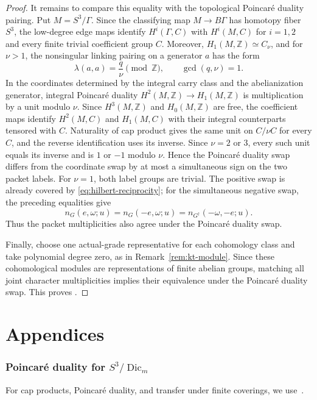 \documentclass[11pt,a4paper,reqno]{amsart}
\theoremstyle{plain}
\theoremstyle{definition}
\theoremstyle{remark}
\numberwithin{equation}{section}
\newcommand{\ZZ}{\mathbb Z}
\newcommand{\Dic}{\operatorname{Dic}}
\begin{document}
\begin{proof}
It remains to compare this equality with the topological Poincar\'e duality pairing. Put $M=S^3/\Gamma$. Since the classifying map $M\to B\Gamma$ has homotopy fiber $S^3$, the low-degree edge maps identify $H^i(\Gamma,C)$ with $H^i(M,C)$ for $i=1,2$ and every finite trivial coefficient group $C$. Moreover, $H_1(M,\ZZ)\simeq C_\nu$, and for $\nu>1$, the nonsingular linking pairing on a generator $a$ has the form
\[
\lambda(a,a)=\frac{q}{\nu}\pmod{\ZZ},\qquad \gcd(q,\nu)=1.
\]
In the coordinates determined by the integral carry class and the abelianization generator, integral Poincar\'e duality $H^2(M,\ZZ)\to H_1(M,\ZZ)$ is multiplication by a unit modulo $\nu$. Since $H^3(M,\ZZ)$ and $H_0(M,\ZZ)$ are free, the coefficient maps identify $H^2(M,C)$ and $H_1(M,C)$ with their integral counterparts tensored with $C$. Naturality of cap product gives the same unit on $C/\nu C$ for every $C$, and the reverse identification uses its inverse. Since $\nu=2$ or $3$, every such unit equals its inverse and is $1$ or $-1$ modulo $\nu$. Hence the Poincar\'e duality swap differs from the coordinate swap by at most a simultaneous sign on the two packet labels. For $\nu=1$, both label groups are trivial. The positive swap is already covered by \eqref{eq:hilbert-reciprocity}; for the simultaneous negative swap, the preceding equalities give
\[
n_G(e,\omega;u)=n_G(-e,\omega;u)=n_{G^\dagger}(-\omega,-e;u).
\]
Thus the packet multiplicities also agree under the Poincar\'e duality swap.

Finally, choose one actual-grade representative for each cohomology class and take polynomial degree zero, as in Remark~\ref{rem:kt-module}. Since these cohomological modules are representations of finite abelian groups, matching all joint character multiplicities implies their equivalence under the Poincar\'e duality swap. This proves \cite[Conjecture~1.9]{kojima-tachikawa}.
\end{proof}

\clearpage
\appendix
\part*{Appendices}

\section{Poincar\'e duality for \texorpdfstring{$S^3/\Dic_m$}{S3/Dic(m)}}\label{sec:poincare}

For cap products, Poincar\'e duality, and transfer under finite coverings, we use~\cite[\S\S3.3 and~3.G]{hatcher}.
\end{document}
